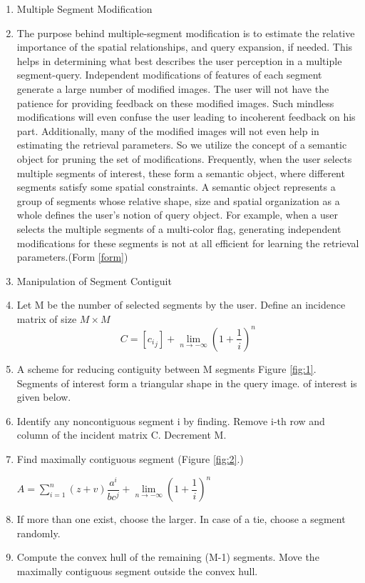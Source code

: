\documentclass{article}
\begin{document}
\begin{enumerate}
    \item  	Multiple Segment Modification 
    \item   The purpose behind multiple-segment modification is to estimate the relative importance of the spatial relationships, and query expansion, if needed. This helps in determining what best describes the user perception in a multiple segment-query. Independent modifications of features of each segment generate a large number of modified images. The user will not have the patience for providing feedback on these modified images. Such mindless modifications will even confuse the user leading to incoherent feedback on his part. Additionally, many of the modified images will not even help in estimating the retrieval parameters. So we utilize the concept of a semantic object for pruning the set of modifications. Frequently, when the user selects multiple segments of interest, these form a semantic object, where different segments satisfy some spatial constraints. A semantic object represents a group of segments whose relative shape, size and spatial organization as a whole defines the user's notion of query object. For example, when a user selects the multiple segments of a multi-color flag, generating independent modifications for these segments is not at all efficient for learning the retrieval parameters.(Form \ref{form})
    \item Manipulation of Segment Contiguit
    \item Let M be the number of selected segments by the user. Define an incidence matrix of size $ M \times M$
    \begin{equation}
        C=[{c_i}_j]+\lim_{n \to -\infty}\left(1+\frac{1}{i}\right)^n\label{form}
    \end{equation}
    \item A scheme for reducing contiguity between M segments Figure \ref{fig:1}. Segments of interest form a triangular shape in the query image. of interest is given below.
    
    \item Identify any noncontiguous segment i by finding. Remove i-th row and column of the incident matrix C. Decrement M.
    
    \item Find maximally contiguous segment (Figure \ref{fig:2}.)
    \begin{center}
    $A = \sum\limits_{i=1}^n(z+v)\dfrac{a^i }{bc^j} + \lim\limits_{n \to -\infty}\left(1+\dfrac{1}{i}\right)^n$
    \end{center} 
    \item If more than one exist, choose the larger. In case of a tie, choose a segment randomly.
    \item Compute the convex hull of the remaining (M-1) segments. Move the maximally contiguous segment outside the convex hull.
    

\end{enumerate}
\end{document}
